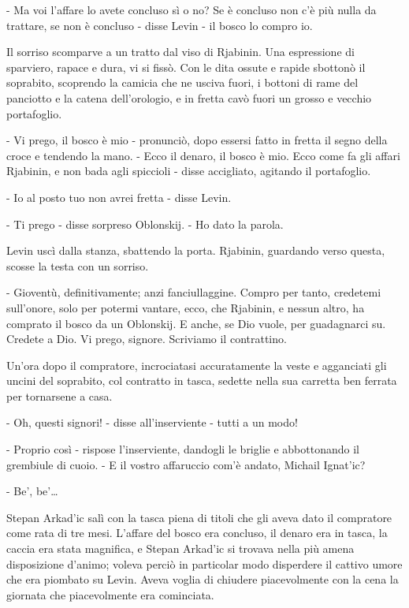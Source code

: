 - Ma voi l'affare lo avete concluso sì o no? Se è concluso non c'è più nulla da trattare, se non è concluso - disse Levin - il bosco lo compro io. 

Il sorriso scomparve a un tratto dal viso di Rjabinin. Una espressione di sparviero, rapace e dura, vi si fissò. Con le dita ossute e rapide sbottonò il soprabito, scoprendo la camicia che ne usciva fuori, i bottoni di rame del panciotto e la catena dell'orologio, e in fretta cavò fuori un grosso e vecchio portafoglio. 

- Vi prego, il bosco è mio - pronunciò, dopo essersi fatto in fretta il segno della croce e tendendo la mano. - Ecco il denaro, il bosco è mio. Ecco come fa gli affari Rjabinin, e non bada agli spiccioli - disse accigliato, agitando il portafoglio. 

- Io al posto tuo non avrei fretta - disse Levin. 

- Ti prego - disse sorpreso Oblonskij. - Ho dato la parola. 

Levin uscì dalla stanza, sbattendo la porta. Rjabinin, guardando verso questa, scosse la testa con un sorriso. 

- Gioventù, definitivamente; anzi fanciullaggine. Compro per tanto, credetemi sull'onore, solo per potermi vantare, ecco, che Rjabinin, e nessun altro, ha comprato il bosco da un Oblonskij. E anche, se Dio vuole, per guadagnarci su. Credete a Dio. Vi prego, signore. Scriviamo il contrattino. 

Un'ora dopo il compratore, incrociatasi accuratamente la veste e agganciati gli uncini del soprabito, col contratto in tasca, sedette nella sua carretta ben ferrata per tornarsene a casa. 

- Oh, questi signori! - disse all'inserviente - tutti a un modo! 

- Proprio così - rispose l'inserviente, dandogli le briglie e abbottonando il grembiule di cuoio. - E il vostro affaruccio com'è andato, Michail Ignat'ic? 

- Be', be'\ldots{} 

Stepan Arkad'ic salì con la tasca piena di titoli che gli aveva dato il compratore come rata di tre mesi. L'affare del bosco era concluso, il denaro era in tasca, la caccia era stata magnifica, e Stepan Arkad'ic si trovava nella più amena disposizione d'animo; voleva perciò in particolar modo disperdere il cattivo umore che era piombato su Levin. Aveva voglia di chiudere piacevolmente con la cena la giornata che piacevolmente era cominciata. 

